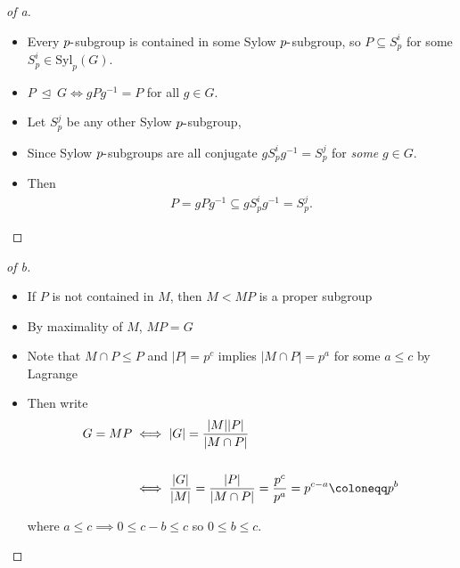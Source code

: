 \begin{solution}

\envlist

\begin{proof}[of a]

\envlist

\begin{itemize}
\item
  Every \(p{\hbox{-}}\)subgroup is contained in some Sylow
  \(p{\hbox{-}}\)subgroup, so \(P \subseteq S_p^i\) for some
  \(S_p^i \in \mathrm{Syl}_p(G)\).
\item
  \(P {~\trianglelefteq~}G \iff gPg^{-1}= P\) for all \(g\in G\).
\item
  Let \(S_p^j\) be any other Sylow \(p{\hbox{-}}\)subgroup,
\item
  Since Sylow \(p{\hbox{-}}\)subgroups are all conjugate
  \(gS_p^i g^{-1}= S_p^j\) for \emph{some} \(g\in G\).
\item
  Then
  \begin{align*}
  P = gPg^{-1}\subseteq gS_p^i g^{-1}= S_p^j
  .\end{align*}
\end{itemize}

\end{proof}

\begin{proof}[of b]

\envlist

\begin{itemize}
\item
  If \(P\) is not contained in \(M\), then \(M < MP\) is a proper
  subgroup
\item
  By maximality of \(M\), \(MP = G\)
\item
  Note that \(M\cap P \leq P\) and
  \({\left\lvert {P} \right\rvert} = p^c\) implies
  \({\left\lvert {M\cap P} \right\rvert} = p^a\) for some \(a\leq c\) by
  Lagrange
\item
  Then write
  \begin{align*}
  G = MP
  &\iff {\left\lvert {G} \right\rvert} = \frac{{\left\lvert {M} \right\rvert} {\left\lvert {P} \right\rvert}}{{\left\lvert {M\cap P} \right\rvert}} \\ \\
  &\iff { {\left\lvert {G} \right\rvert} \over {\left\lvert {M} \right\rvert}} = {{\left\lvert {P} \right\rvert}  \over {\left\lvert {M\cap P} \right\rvert}} = {p^c \over p^a} = p^{c-a} \coloneqq p^b
  \end{align*}

  where \(a\leq c \implies 0 \leq c-b \leq c\) so \(0\leq b \leq c\).
\end{itemize}

\end{proof}

\end{solution}

